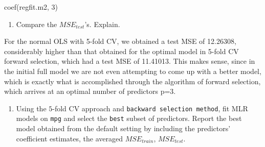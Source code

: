 \documentclass[
]{article}
\newenvironment{Shaded}{\begin{snugshade}}{\end{snugshade}}
\newcommand{\DecValTok}[1]{\textcolor[rgb]{0.00,0.00,0.81}{#1}}
\newcommand{\FunctionTok}[1]{\textcolor[rgb]{0.00,0.00,0.00}{#1}}
\newcommand{\NormalTok}[1]{#1}
\providecommand{\tightlist}{%
  \setlength{\itemsep}{0pt}\setlength{\parskip}{0pt}}
\begin{document}
\begin{Shaded}
\begin{Highlighting}[]
\FunctionTok{coef}\NormalTok{(regfit.m2, }\DecValTok{3}\NormalTok{)}
\end{Highlighting}
\end{Shaded}

\begin{enumerate}
\def\labelenumi{\alph{enumi}.}
\setcounter{enumi}{2}
\tightlist
\item
  Compare the \(MSE_{test}\)'s. Explain.
\end{enumerate}

For the normal OLS with 5-fold CV, we obtained a test MSE of 12.26308,
considerably higher than that obtained for the optimal model in 5-fold
CV forward selection, which had a test MSE of 11.41013. This makes
sense, since in the initial full model we are not even attempting to
come up with a better model, which is exactly what is accomplished
through the algorithm of forward selection, which arrives at an optimal
number of predictors p=3.

\begin{enumerate}
\def\labelenumi{\alph{enumi}.}
\setcounter{enumi}{3}
\tightlist
\item
  Using the \(5\)-fold CV approach and
  \texttt{backward\ selection\ method}, fit MLR models on \texttt{mpg}
  and select the \texttt{best} subset of predictors. Report the best
  model obtained from the default setting by including the predictors'
  coefficient estimates, the averaged \(MSE_{train}\), \(MSE_{test}\).
\end{enumerate}
\end{document}
